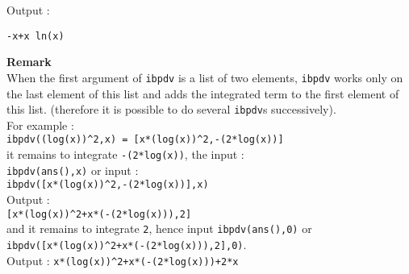\documentclass[a4paper,11pt]{book}
\begin{document}
Output :
\begin{center}{\tt -x+x ln(x)}\end{center}
{\bf Remark}\\
 When the first argument of {\tt ibpdv} is a list of two elements, {\tt ibpdv} 
works only on the last element of this list and adds the integrated term to
the first element of this list.  
(therefore it is possible to do several {\tt ibpdv}s successively).\\
For example :\\
{\tt ibpdv((log(x))\verb|^|2,x) = [x*(log(x))\verb|^|2,-(2*log(x))]}\\ 
it remains to integrate {\tt -(2*log(x))}, the input :\\
{\tt ibpdv(ans(),x)} or input :\\
{\tt ibpdv([x*(log(x))\verb|^|2,-(2*log(x))],x)}\\
Output :\\
{\tt [x*(log(x))\verb|^|2+x*(-(2*log(x))),2]}\\
and it remains to integrate {\tt 2}, hence input {\tt ibpdv(ans(),0)} or\\
{\tt ibpdv([x*(log(x))\verb|^|2+x*(-(2*log(x))),2],0)}.\\
Output :
{\tt x*(log(x))\verb|^|2+x*(-(2*log(x)))+2*x}
\end{document}
